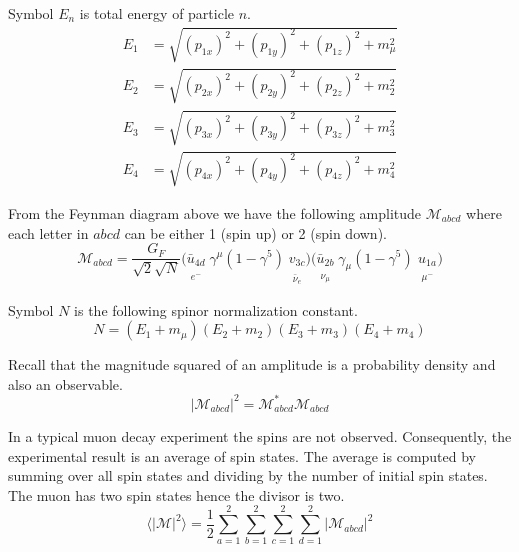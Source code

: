 \documentclass[12pt]{article}
\begin{document}
\noindent
Symbol $E_n$ is total energy of particle $n$.
\begin{align*}
E_1&=\sqrt{(p_{1x})^2+(p_{1y})^2+(p_{1z})^2+m_\mu^2}
\\
E_2&=\sqrt{(p_{2x})^2+(p_{2y})^2+(p_{2z})^2+m_2^2}
\\
E_3&=\sqrt{(p_{3x})^2+(p_{3y})^2+(p_{3z})^2+m_3^2}
\\
E_4&=\sqrt{(p_{4x})^2+(p_{4y})^2+(p_{4z})^2+m_4^2}
\end{align*}

\noindent
From the Feynman diagram above we have the following amplitude $\mathcal{M}_{abcd}$
where each letter in $abcd$ can be either 1 (spin up) or 2 (spin down).
\begin{equation*}
\mathcal{M}_{abcd}=\frac{G_F}{\sqrt{2}\sqrt{N}}
\big(
\underset{\substack{\\[1ex]e^-}}{\bar{u}_{4d}}
\;
\underset{\substack{\\[1ex] }}{\gamma^\mu(1-\gamma^5)}
\;
\underset{\substack{\\[1ex]\bar{\nu}_e}}{v_{3c}}
\big)
\big(
\underset{\substack{\\[1ex]\nu_\mu}}{\bar{u}_{2b}}
\;
\underset{\substack{\\[1ex] }}{\gamma_\mu(1-\gamma^5)}
\;
\underset{\substack{\\[1ex]\mu^-}}{u_{1a}}
\big)
\end{equation*}

\noindent
Symbol $N$ is the following spinor normalization constant.
\begin{equation*}
N=(E_1+m_\mu)(E_2+m_2)(E_3+m_3)(E_4+m_4)
\end{equation*}

\noindent
Recall that the magnitude squared of an amplitude is a probability density and also an observable.
\begin{equation*}
|\mathcal{M}_{abcd}|^2=\mathcal{M}_{abcd}^*\mathcal{M}_{abcd}
\end{equation*}

\noindent
In a typical muon decay experiment the spins are not observed.
Consequently, the experimental result is an average of spin states.
The average is computed by summing over all spin states and dividing by the number of initial spin states.
The muon has two spin states hence the divisor is two.
\begin{equation*}
\langle|\mathcal{M}|^2\rangle=
\frac{1}{2}
\sum_{a=1}^2\sum_{b=1}^2\sum_{c=1}^2\sum_{d=1}^2
|\mathcal{M}_{abcd}|^2
\end{equation*}
\end{document}
